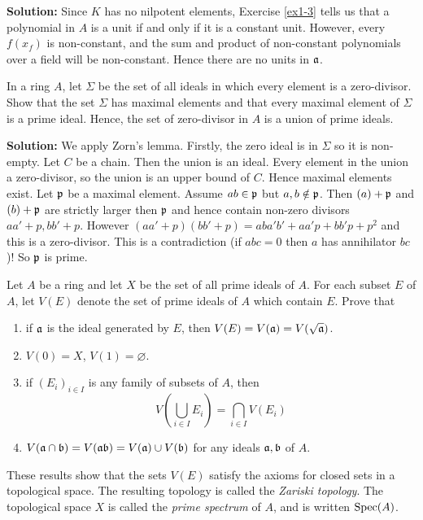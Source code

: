 \documentclass{article}
\begin{document}
\noindent\textbf{Solution:}
Since \(K\) has no nilpotent elements, Exercise \ref{ex1-3} tells us that a polynomial in \(A\) is a unit if and only if it is a constant unit.
However, every \(f(x_f)\) is non-constant, and the sum and product of non-constant polynomials over a field will be non-constant.
Hence there are no units in \(\mathfrak{a}\).

\begin{exercise}
    In a ring \(A\), let \(\Sigma\) be the set of all ideals in which every element is a zero-divisor.
    Show that the set \(\Sigma\) has maximal elements and that every maximal element of \(\Sigma\) is a prime ideal.
    Hence, the set of zero-divisor in \(A\) is a union of prime ideals.
\end{exercise}

\noindent\textbf{Solution:}
We apply Zorn's lemma.
Firstly, the zero ideal is in \(\Sigma\) so it is non-empty.
Let \(C\) be a chain.
Then the union is an ideal.
Every element in the union a zero-divisor, so the union is an upper bound of \(C\).
Hence maximal elements exist.
Let \(\mathfrak{p}\) be a maximal element.
Assume \(ab \in \mathfrak{p}\) but \(a, b \notin \mathfrak{p}\).
Then \((a) + \mathfrak{p}\) and \((b) + \mathfrak{p}\) are strictly larger then \(\mathfrak{p}\) and hence contain non-zero divisors \(aa' + p, bb' + p\).
However \((aa' + p)(bb' + p) = aba'b' + aa'p + bb'p + p^2\) and this is a zero-divisor.
This is a contradiction (if \(abc = 0\) then \(a\) has annihilator \(bc\))!
So \(\mathfrak{p}\) is prime.

\begin{exercise} \label{ex1-15}
    Let \(A\) be a ring and let \(X\) be the set of all prime ideals of \(A\).
    For each subset \(E\) of \(A\), let \(V(E)\) denote the set of prime ideals of \(A\) which contain \(E\).
    Prove that
    \begin{enumerate}
        \item
            if \(\mathfrak{a}\) is the ideal generated by \(E\), then \(V(E) = V(\mathfrak{a}) = V(\sqrt{\mathfrak{a}})\).
        \item
            \(V(0) = X\), \(V(1) = \varnothing\).
        \item
            if \((E_i)_{i \in I}\) is any family of subsets of \(A\), then
            \[
                V(\bigcup_{i \in I} E_i) = \bigcap_{i \in I} V(E_i)
            \]
        \item
            \(V(\mathfrak{a} \cap \mathfrak{b}) = V(\mathfrak{a} \mathfrak{b}) = V(\mathfrak{a}) \cup V(\mathfrak{b})\) for any ideals \(\mathfrak{a}, \mathfrak{b}\) of \(A\).
    \end{enumerate}
    These results show that the sets \(V(E)\) satisfy the axioms for closed sets in a topological space.
    The resulting topology is called the \textit{Zariski topology}.
    The topological space \(X\) is called the \textit{prime spectrum} of \(A\), and is written \(\operatorname{Spec}(A)\).
\end{exercise}
\end{document}
